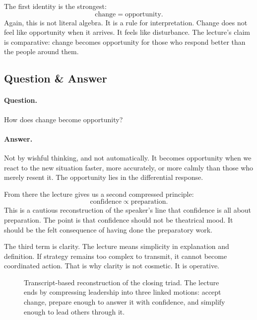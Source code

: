 The first identity is the strongest:
\begin{equation}
\text{change}=\text{opportunity}.
\end{equation}
Again, this is not literal algebra. It is a rule for interpretation. Change does not feel like opportunity when it arrives. It feels like disturbance. The lecture's claim is comparative: change becomes opportunity for those who respond better than the people around them.

\subsection{Question \& Answer}

\paragraph{Question.} How does change become opportunity?

\paragraph{Answer.} Not by wishful thinking, and not automatically. It becomes opportunity when we react to the new situation faster, more accurately, or more calmly than those who merely resent it. The opportunity lies in the differential response.

From there the lecture gives us a second compressed principle:
\begin{equation}
\text{confidence}\propto \text{preparation}.
\end{equation}
This is a cautious reconstruction of the speaker's line that confidence is all about preparation. The point is that confidence should not be theatrical mood. It should be the felt consequence of having done the preparatory work.

The third term is clarity. The lecture means simplicity in explanation and definition. If strategy remains too complex to transmit, it cannot become coordinated action. That is why clarity is not cosmetic. It is operative.

\begin{figure}[h]
\centering
{}
\caption{Transcript-based reconstruction of the closing triad. The lecture ends by compressing leadership into three linked motions: accept change, prepare enough to answer it with confidence, and simplify enough to lead others through it.}
\end{figure}

